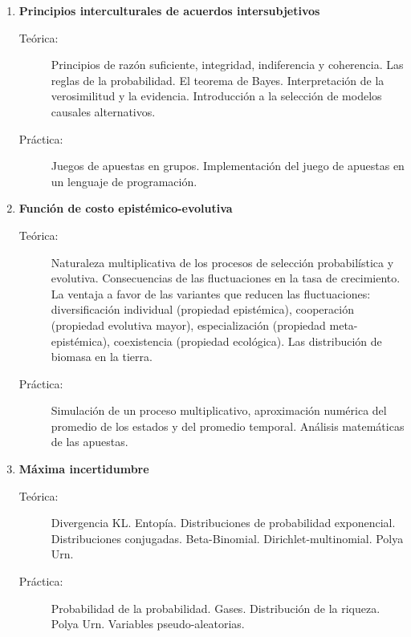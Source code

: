 \documentclass[10pt]{article}
\begin{document}
\begin{enumerate}

\item \textbf{Principios interculturales de acuerdos intersubjetivos} 
\vspace{-0.15cm}
\begin{description}
\item[Teórica:] Principios de razón suficiente, integridad, indiferencia y coherencia. Las reglas de la probabilidad. El teorema de Bayes. Interpretación de la verosimilitud y la evidencia. Introducción a la selección de modelos causales alternativos.
\item[Práctica:] Juegos de apuestas en grupos. Implementación del juego de apuestas en un lenguaje de programación.
\end{description}

\vspace{0.1cm}
\item \textbf{Función de costo epistémico-evolutiva}
\vspace{-0.15cm}
\begin{description}
\item[Teórica:] Naturaleza multiplicativa de los procesos de selección probabilística y evolutiva. Consecuencias de las fluctuaciones en la tasa de crecimiento. La ventaja a favor de las variantes que reducen las fluctuaciones: diversificación individual (propiedad epistémica), cooperación (propiedad evolutiva mayor), especialización (propiedad meta-epistémica), coexistencia (propiedad ecológica). Las distribución de biomasa en la tierra.
\item[Práctica:] Simulación de un proceso multiplicativo, aproximación numérica del promedio de los estados y del promedio temporal. Análisis matemáticas de las apuestas.
\end{description}


\vspace{0.1cm}
\item \textbf{Máxima incertidumbre}
\vspace{-0.15cm}
\begin{description}
\item[Teórica:] Divergencia KL. Entopía. Distribuciones de probabilidad exponencial. Distribuciones conjugadas. Beta-Binomial. Dirichlet-multinomial. Polya Urn.
\item[Práctica:] Probabilidad de la probabilidad. Gases. Distribución de la riqueza. Polya Urn. Variables pseudo-aleatorias.
\end{description}


\end{enumerate}
\end{document}
